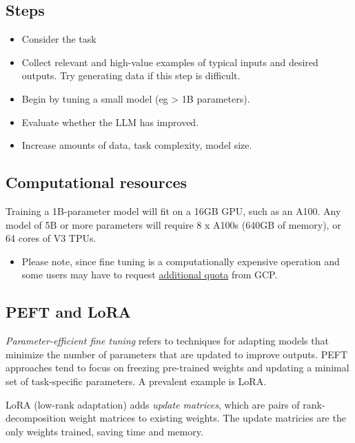 \documentclass[
  letterpaper,
  DIV=11,
  numbers=noendperiod]{scrreprt}
\providecommand{\tightlist}{%
  \setlength{\itemsep}{0pt}\setlength{\parskip}{0pt}}\usepackage{longtable,booktabs,array}
\begin{document}
\hypertarget{steps}{%
\subsection{Steps}\label{steps}}

\begin{itemize}
\tightlist
\item
  Consider the task
\item
  Collect relevant and high-value examples of typical inputs and desired
  outputs. Try generating data if this step is difficult.
\item
  Begin by tuning a small model (eg \textgreater{} 1B parameters).
\item
  Evaluate whether the LLM has improved.
\item
  Increase amounts of data, task complexity, model size.
\end{itemize}

\hypertarget{computational-resources}{%
\subsection{Computational resources}\label{computational-resources}}

Training a 1B-parameter model will fit on a 16GB GPU, such as an A100.
Any model of 5B or more parameters will require 8 x A100s (640GB of
memory), or 64 cores of V3 TPUs.

\begin{itemize}
\tightlist
\item
  Please note, since fine tuning is a computationally expensive
  operation and some users may have to request
  \href{https://cloud.google.com/vertex-ai/docs/generative-ai/models/tune-text-models\#quota}{additional
  quota} from GCP.
\end{itemize}

\hypertarget{peft-and-lora}{%
\subsection{PEFT and LoRA}\label{peft-and-lora}}

\emph{Parameter-efficient fine tuning} refers to techniques for adapting
models that minimize the number of parameters that are updated to
improve outputs. PEFT approaches tend to focus on freezing pre-trained
weights and updating a minimal set of task-specific parameters. A
prevalent example is LoRA.

LoRA (low-rank adaptation) adds \emph{update matrices}, which are pairs
of rank-decomposition weight matrices to existing weights. The update
matricies are the only weights trained, saving time and memory.
\end{document}
